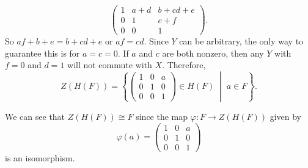\begin{solution}
\begin{equation*}
\begin{pmatrix}
      1 & a + d & b + cd + e \\
      0 & 1 & c + f \\
      0 & 0 & 1
    \end{pmatrix}.
  \end{equation*}
  So $af + b + e = b + cd + e$ or $af = cd$. Since $Y$ can be
  arbitrary, the only way to guarantee this is for $a = c = 0$. If $a$
  and $c$ are both nonzero, then any $Y$ with $f = 0$ and $d = 1$ will
  not commute with $X$. Therefore,
  \begin{equation*}
    Z(H(F)) =
    \left\{
    \begin{pmatrix}
      1 & 0 & a \\
      0 & 1 & 0 \\
      0 & 0 & 1
    \end{pmatrix}
    \in H(F)
    \;\middle|\;
    a\in F
    \right\}.
  \end{equation*}

  We can see that $Z(H(F))\cong F$ since the map
  $\varphi\colon F\to Z(H(F))$ given by
  \begin{equation*}
    \varphi(a) =
    \begin{pmatrix}
      1 & 0 & a \\
      0 & 1 & 0 \\
      0 & 0 & 1
    \end{pmatrix}
  \end{equation*}
  is an isomorphism.
\end{solution}
